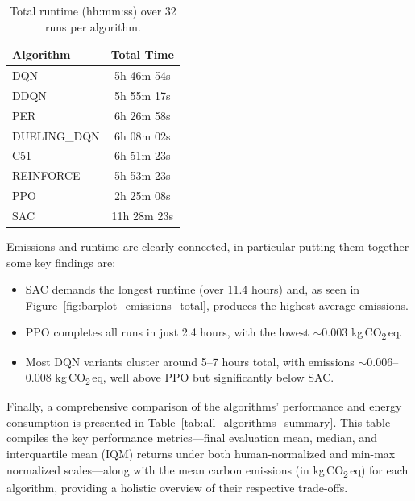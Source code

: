 \begin{table} 
	\centering
	\caption{Total runtime (hh:mm:ss) over 32 runs per algorithm.}
	\label{tab:total_runtimes}
	\begin{tabular}{lc}
		\toprule
		\textbf{Algorithm} & \textbf{Total Time} \\
		\midrule
		DQN          & 5h 46m 54s \\
		DDQN         & 5h 55m 17s \\
		PER          & 6h 26m 58s \\
		DUELING\_DQN & 6h 08m 02s \\
		C51          & 6h 51m 23s \\
		REINFORCE    & 5h 53m 23s \\
		PPO          & 2h 25m 08s \\
		SAC          & 11h 28m 23s \\
		\bottomrule
	\end{tabular}
\end{table}

Emissions and runtime are clearly connected, in particular putting them together some key findings are:
\begin{itemize}
	\item SAC demands the longest runtime (over 11.4 hours) and, as seen in 
	Figure~\ref{fig:barplot_emissions_total}, produces the highest average emissions. 
	\item PPO completes all runs in just 2.4 hours, with the lowest \(\sim0.003\) 
	kg\,CO\textsubscript{2}\,eq. 
	\item Most DQN variants cluster around 5--7 hours total, with emissions 
	\(\sim0.006\)--0.008 kg\,CO\textsubscript{2}\,eq, well above PPO but significantly below SAC.
\end{itemize}

Finally, a comprehensive comparison of the algorithms' performance and energy consumption is presented in Table~\ref{tab:all_algorithms_summary}. This table compiles the key performance metrics—final evaluation mean, median, and interquartile mean (IQM) returns under both human-normalized and min-max normalized scales—along with the mean carbon emissions (in kg\,CO\textsubscript{2}\,eq) for each algorithm, providing a holistic overview of their respective trade-offs.

